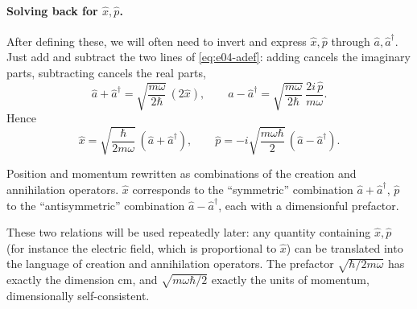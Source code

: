\paragraph{Solving back for \(\hat x,\hat p\).}
After defining these, we will often need to invert and express \(\hat x,\hat p\) through \(\hat a,\hat a^\dagger\). Just add and subtract the two lines of \eqref{eq:e04-adef}: adding cancels the imaginary parts, subtracting cancels the real parts,
\[
  \hat a+\hat a^\dagger=\sqrt{\frac{m\omega}{2\hbar}}\,(2\hat x),
  \qquad
  \hat a-\hat a^\dagger=\sqrt{\frac{m\omega}{2\hbar}}\,\frac{2i\,\hat p}{m\omega}.
\]
Hence
\begin{equation}
  \hat x=\sqrt{\frac{\hbar}{2m\omega}}\,(\hat a+\hat a^\dagger),
  \qquad
  \hat p=-i\sqrt{\frac{m\omega\hbar}{2}}\,(\hat a-\hat a^\dagger).
  \label{eq:e04-xp-in-a}
\end{equation}
\begin{formulaexplain}
Position and momentum rewritten as combinations of the creation and annihilation operators. \(\hat x\) corresponds to the ``symmetric'' combination \(\hat a+\hat a^\dagger\), \(\hat p\) to the ``antisymmetric'' combination \(\hat a-\hat a^\dagger\), each with a dimensionful prefactor.
\end{formulaexplain}
These two relations will be used repeatedly later: any quantity containing \(\hat x,\hat p\) (for instance the electric field, which is proportional to \(\hat x\)) can be translated into the language of creation and annihilation operators. The prefactor \(\sqrt{\hbar/2m\omega}\) has exactly the dimension cm, and \(\sqrt{m\omega\hbar/2}\) exactly the units of momentum, dimensionally self-consistent.

